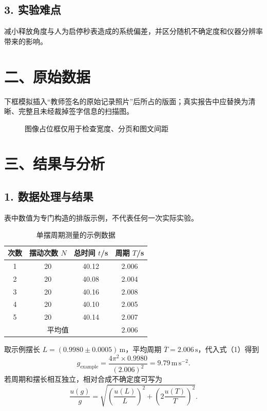 \documentclass[a4paper]{article}
\begin{document}
\subsection*{3. 实验难点}
减小释放角度与人为启停秒表造成的系统偏差，并区分随机不确定度和仪器分辨率带来的影响。

\section*{二、原始数据}
下框模拟插入“教师签名的原始记录照片”后所占的版面；真实报告中应替换为清晰、完整且未经裁掉签字信息的扫描图。

\begin{figure}[htbp]
  \centering
  \caption*{图像占位框仅用于检查宽度、分页和图文间距}
\end{figure}

\clearpage
\section*{三、结果与分析}
\subsection*{1. 数据处理与结果}
表中数值为专门构造的排版示例，不代表任何一次实际实验。

\begin{table}[htbp]
  \centering
  \caption{单摆周期测量的示例数据}
  \begin{tabular}{|c|c|c|c|}
    \hline
    次数 & 摆动次数 $N$ & 总时间 $t$/s & 周期 $T$/s \\
    \hline
    1 & 20 & 40.12 & 2.006 \\
    2 & 20 & 40.08 & 2.004 \\
    3 & 20 & 40.16 & 2.008 \\
    4 & 20 & 40.10 & 2.005 \\
    5 & 20 & 40.14 & 2.007 \\
    \hline
    \multicolumn{3}{|c|}{平均值} & 2.006 \\
    \hline
  \end{tabular}
\end{table}

取示例摆长 $L=(0.9980\pm0.0005)\,\mathrm{m}$，平均周期
$\overline{T}=2.006\,\mathrm{s}$，代入式（1）得到
\[
  g_{\mathrm{example}}=\frac{4\pi^2\times0.9980}{(2.006)^2}
  =9.79\,\mathrm{m\,s^{-2}}.
\]
若周期和摆长相互独立，相对合成不确定度可写为
\[
  \frac{u(g)}{g}=\sqrt{\left(\frac{u(L)}{L}\right)^2+
  \left(2\frac{u(T)}{T}\right)^2}.
\]
\end{document}
